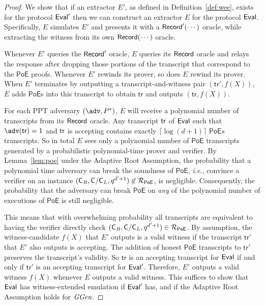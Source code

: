 \begin{proof}
We show that if an extractor $E'$, as defined in Definition~\ref{def:wee}, exists for the protocol $\textsf{{Eval}}'$ then we can construct an extractor $E$ for the protocol $\textsf{{Eval}}$. Specifically, $E$ simulates $E'$ and presents it with a $\textsf{{Record}}'(\cdots)$ oracle, while extracting the witness from its own $\textsf{{Record}}(\cdots)$ oracle.

Whenever $E'$ queries the $\textsf{{Record}}'$ oracle, $E$ queries its $\textsf{{Record}}$ oracle and relays the response after dropping those portions of the transcript that correspond to the $\mathsf{PoE}$ proofs. Whenever $E'$ rewinds its prover, so does $E$ rewind its prover. When $E'$ terminates by outputting a transcript-and-witness pair $(\mathsf{tr}', f(X))$, $E$ adds $\mathsf{PoE}$s into this transcript to obtain $\mathsf{tr}$ and outputs $(\mathsf{tr}, f(X))$.

For each PPT adversary $(\adv,P^*)$, $E$ will receive a polynomial number of transcripts from its $\textsf{{Record}}$ oracle. Any transcript $\textsf{{tr}}$ of $\textsf{{Eval}}$ such that $\adv(\tr)=1$ and $\textsf{{tr}}$ is accepting contains exactly $\lceil \log(d+1)\rceil$ $\textsf{PoE}s$ transcripts. 
So in total $E$ sees only a polynomial number of $\textsf{PoE}$ transcripts generated by a probabilistic polynomial-time prover and verifier. By Lemma~\ref{lem:poe} under the Adaptive Root Assumption, the probability that a polynomial time adversary can break the soundness of $\textsf{PoE}$, \emph{i.e.}, convince a verifier on an instance $(\mathsf{C}_R,\mathsf{C}/\mathsf{C}_{L},q^{d'+1})\not\in\mathcal{R}_{\textsf{PoE}}$, is negligible. 
Consequently, the probability that the adversary can break $\textsf{PoE}$ on \emph{any} of the polynomial number of executions of $\mathsf{PoE}$ is still negligible.

This means that with overwhelming probability all transcripts are equivalent to having the verifier directly check $(\mathsf{C}_R,\mathsf{C}/\mathsf{C}_{L},q^{d'+1})\in\mathcal{R}_{\textsf{PoE}}$. By assumption, the witness-candidate $f(X)$ that $E'$ outputs is a valid witness if the transcript $\mathsf{tr}'$ that $E'$ also outputs is accepting. The addition of honest $\mathsf{PoE}$ transcripts to $\mathsf{tr}'$ preserves the transcript's validity. So $\mathsf{tr}$ is an accepting transcript for $\textsf{{Eval}}$ if and only if $\mathsf{tr}'$ is an accepting transcript for $\textsf{{Eval}}'$. Therefore, $E'$ outputs a valid witness $f(X)$ whenever $E$ outputs a valid witness. This suffices to show that $\textsf{{Eval}}$ has witness-extended emulation if $\textsf{{Eval}}'$ has, and if the Adaptive Root Assumption holds for $\textit{GGen}$.
\end{proof}

